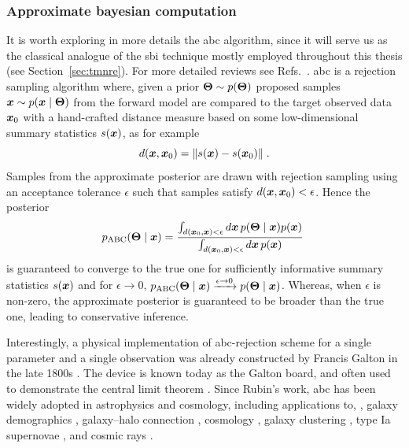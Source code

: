\subsubsection{Approximate bayesian computation}

It is worth exploring in more details the \gls*{abc} algorithm, since it will serve us as the classical analogue of the \gls*{sbi} technique mostly employed throughout this thesis (see Section~\ref{sec:tmnre}). For more detailed reviews see Refs.~\cite{marin2012approximate, Sisson:2018aa, Grazian:2019aa}. \Gls*{abc} is a rejection sampling algorithm where, given a prior $\bm{\Theta}\sim p(\bm{\Theta})$ proposed samples $\bm{x} \sim p(\bm{x}\mid\bm{\Theta})$ from the forward model are compared to the target observed data $\bm{x}_0$ with a hand-crafted distance measure based on some low-dimensional summary statistics $s(\bm{x})$, as for example
\begin{equation}
    d(\bm{x}, \bm{x}_0)  = \| s(\bm{x}) - s(\bm{x}_0)\|\;.
\end{equation}
Samples from the approximate posterior are drawn with rejection sampling using an acceptance tolerance $\epsilon$ such that samples satisfy $d(\bm{x}, \bm{x}_0) < \epsilon$.
Hence the posterior
\begin{equation}
    p_\text{ABC}(\bm{\Theta}\mid\bm{x}) = \frac
    {\int_{d(\bm{x}_0, \bm{x}) < \epsilon} d\bm{x}\, p(\bm{\Theta}\mid\bm{x})p(\bm{x})}
    {\int_{d(\bm{x}_0, \bm{x}) < \epsilon} d\bm{x}\, p(\bm{x})} \;
\end{equation}
is guaranteed to converge to the true one for sufficiently informative summary statistics $s(\bm{x})$ and for $\epsilon \to 0$, $p_\text{ABC}(\bm{\Theta}\mid\bm{x}) \xrightarrow{\epsilon \to 0} p(\bm{\Theta}\mid\bm{x})$. Whereas, when $\epsilon$ is non-zero, the approximate posterior is guaranteed to be broader than the true one, leading to conservative inference. 

Interestingly, a physical implementation of \gls*{abc}-rejection scheme for a single parameter and a single observation was already constructed by Francis Galton in the late 1800s \cite[Figure 5]{stigler2010darwin}. The device is known today as the Galton board, and often used to demonstrate the central limit theorem \cite{galton1889natural}. Since Rubin's work, \gls*{abc} has been widely adopted in astrophysics and cosmology, including applications to, \eg, galaxy demographics \cite{cameron2012approximate}, galaxy–halo connection \cite{hahn2017approximate}, cosmology \cite{Akeret:2015uha, jennings2017astroabc}, galaxy clustering \cite{Ishida:2015wla}, type Ia supernovae \cite{Weyant:2012xe}, and cosmic rays \cite{bourriche2024beyond}.


